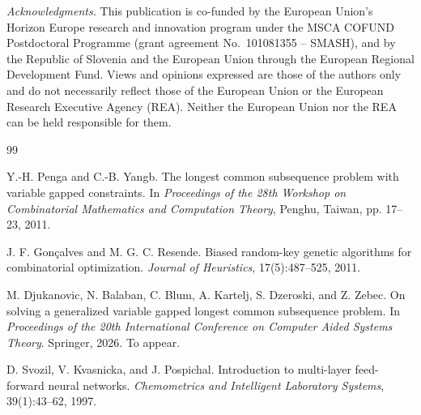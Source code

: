 \documentclass{sigplanconf}
\begin{document}
	\textit{Acknowledgments.} This publication is co-funded by the European Union’s Horizon Europe research and innovation program under the MSCA COFUND Postdoctoral Programme (grant agreement No.~101081355 -- SMASH), and by the Republic of Slovenia and the European Union through the European Regional Development Fund. Views and opinions expressed are those of the authors only and do not necessarily reflect those of the European Union or the European Research Executive Agency (REA). Neither the European Union nor the REA can be held responsible for them.
	
	
\begin{thebibliography}{99}
	
	Y.-H. Penga and C.-B. Yangb.
	The longest common subsequence problem with variable gapped constraints.
	In \textit{Proceedings of the 28th Workshop on Combinatorial Mathematics and Computation Theory}, Penghu, Taiwan, pp. 17--23, 2011.
	

	J. F. Gonçalves and M. G. C. Resende.
	Biased random-key genetic algorithms for combinatorial optimization.
	\textit{Journal of Heuristics}, 17(5):487--525, 2011.
	
	M. Djukanovic, N. Balaban, C. Blum, A. Kartelj, S. Dzeroski, and Z. Zebec.
	On solving a generalized variable gapped longest common subsequence problem.
	In \textit{Proceedings of the 20th International Conference on Computer Aided Systems Theory}. Springer, 2026. To appear.
	
	D. Svozil, V. Kvasnicka, and J. Pospichal.
	Introduction to multi-layer feed-forward neural networks.
	\textit{Chemometrics and Intelligent Laboratory Systems}, 39(1):43--62, 1997.
	
\end{thebibliography}
	
\end{document}
